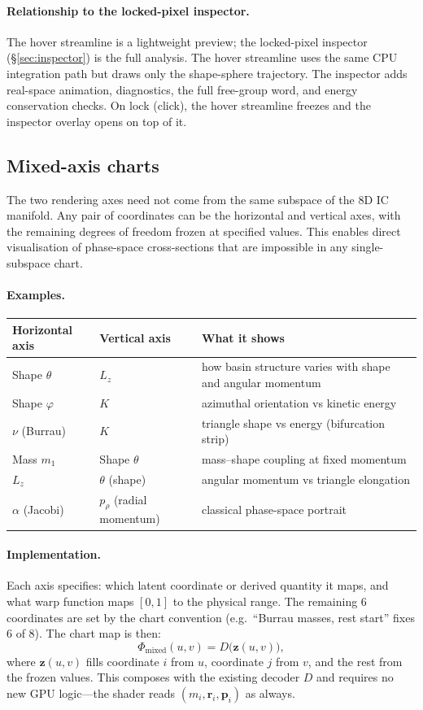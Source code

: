 \documentclass[11pt]{report}
\begin{document}
\paragraph{Relationship to the locked-pixel inspector.} The hover streamline is a lightweight preview; the locked-pixel inspector (\S\ref{sec:inspector}) is the full analysis. The hover streamline uses the same CPU integration path but draws only the shape-sphere trajectory. The inspector adds real-space animation, diagnostics, the full free-group word, and energy conservation checks. On lock (click), the hover streamline freezes and the inspector overlay opens on top of it.

\subsection{Mixed-axis charts}
\label{sec:mixed_axis}

The two rendering axes need not come from the same subspace of the 8D IC manifold. Any pair of coordinates can be the horizontal and vertical axes, with the remaining degrees of freedom frozen at specified values. This enables direct visualisation of phase-space cross-sections that are impossible in any single-subspace chart.

\paragraph{Examples.}
\begin{center}
\begin{tabular}{lll}
\toprule
Horizontal axis & Vertical axis & What it shows \\
\midrule
Shape $\theta$ & $L_z$ & how basin structure varies with shape and angular momentum \\
Shape $\varphi$ & $K$ & azimuthal orientation vs kinetic energy \\
$\nu$ (Burrau) & $K$ & triangle shape vs energy (bifurcation strip) \\
Mass $m_1$ & Shape $\theta$ & mass--shape coupling at fixed momentum \\
$L_z$ & $\theta$ (shape) & angular momentum vs triangle elongation \\
$\alpha$ (Jacobi) & $p_\rho$ (radial momentum) & classical phase-space portrait \\
\bottomrule
\end{tabular}
\end{center}

\paragraph{Implementation.} Each axis specifies: which latent coordinate or derived quantity it maps, and what warp function maps $[0,1]$ to the physical range. The remaining 6 coordinates are set by the chart convention (e.g.\ ``Burrau masses, rest start'' fixes 6 of 8). The chart map is then:
\[
\Phi_{\mathrm{mixed}}(u,v)=D\big(\mathbf z(u,v)\big),
\]
where $\mathbf z(u,v)$ fills coordinate $i$ from $u$, coordinate $j$ from $v$, and the rest from the frozen values. This composes with the existing decoder $D$ and requires no new GPU logic---the shader reads $(m_i,\mathbf r_i,\mathbf p_i)$ as always.
\end{document}
